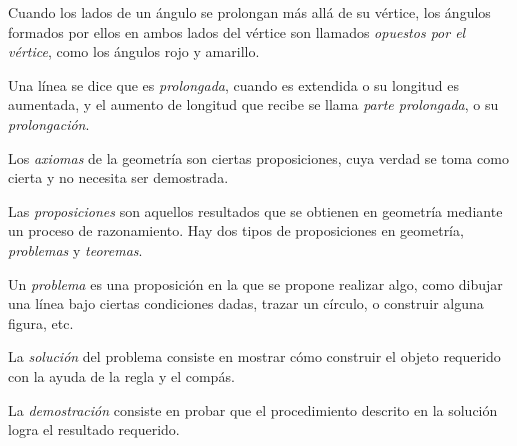 \documentclass[booklanguage=english]{byrnebook}
\begin{document}
Cuando los lados de un ángulo se prolongan más allá de su vértice, los ángulos formados por ellos en ambos lados del vértice son llamados \emph{opuestos por el vértice}, como los ángulos rojo y amarillo.

\pagebreak


Una línea se dice que es \emph{prolongada}, cuando es extendida o su longitud es aumentada, y el aumento de longitud que recibe se llama \emph{parte prolongada}, o su \emph{prolongación}.



Los \emph{axiomas} de la geometría son ciertas proposiciones, cuya verdad se toma como cierta y no necesita ser demostrada.

Las \emph{proposiciones} son aquellos resultados que se obtienen en geometría mediante un proceso de razonamiento. Hay dos tipos de proposiciones en geometría, \emph{problemas} y \emph{teoremas}.

Un \emph{problema} es una proposición en la que se propone realizar algo, como dibujar una línea bajo ciertas condiciones dadas, trazar un círculo, o construir alguna figura, etc.

La \emph{solución} del problema consiste en mostrar cómo construir el objeto requerido con la ayuda de la regla y el compás.

La \emph{demostración} consiste en probar que el procedimiento descrito en la solución logra el resultado requerido.

\pagebreak
\end{document}
